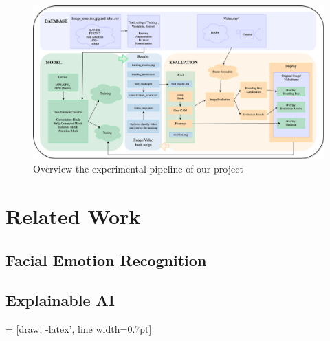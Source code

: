\begin{figure}[ht]
  \centering
   \includegraphics[width=\linewidth]{pipeline.png}
   \caption{Overview the experimental pipeline of our project} 
   \label{fig:pipeline}
\end{figure}

\section{Related Work}
\label{sec:related}

\subsection{Facial Emotion Recognition}
\label{sec:related:fer}

\subsection{Explainable AI}
\label{sec:related:ai}

 = [draw, -latex', line width=0.7pt]


